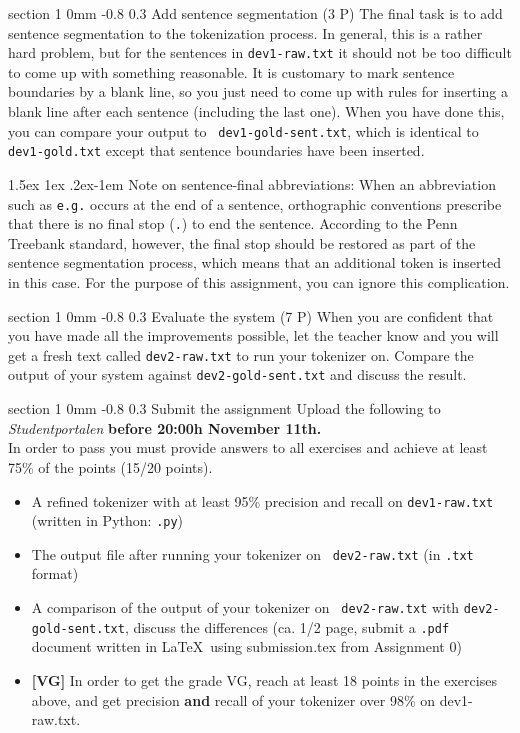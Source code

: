\documentclass[11pt]{article}
\makeatletter
\newcommand{\newsec}[2]{\section{#1}\label{sec:#2}\noindent}
\renewcommand{\section}{\@startsection
{section}%
{1}%
{0mm}%
{-0.8\baselineskip}%
{0.3\baselineskip}%
{\bfseries\large}}%
\renewcommand{\paragraph}{%
  \@startsection{paragraph}{4}%
  {\z@}{1.5ex \@plus 1ex \@minus .2ex}{-1em}%
  {\normalfont\normalsize\bfseries}%
}\makeatother
\makeatother
\begin{document}
\newsec{Add sentence segmentation (3 P)}{sent}%
The final task is to add sentence segmentation to the tokenization
process. In general, this is a rather hard problem, but for the
sentences in {\tt dev1-raw.txt} it should not be too difficult to come
up with something reasonable. It is customary to mark sentence
boundaries by a blank line, so you just need to come up with rules for
inserting a blank line after each sentence (including the last
one). When you have done this, you can compare your output to {\tt
  dev1-gold-sent.txt}, which is identical to {\tt dev1-gold.txt}
except that sentence boundaries have been inserted.

\paragraph{Note on sentence-final abbreviations:} When an abbreviation
such as {\tt e.g.} occurs at the end of a sentence, orthographic
conventions prescribe that there is no final stop ({\tt .}) to end the
sentence. According to the Penn Treebank standard, however, the final
stop should be restored as part of the sentence segmentation process,
which means that an additional token is inserted in this case. For the
purpose of this assignment, you can ignore this complication.

\newsec{Evaluate the system (7 P)}{eval}%
When you are confident that you have made all the improvements
possible, let the teacher know and you will get a fresh text called
{\tt dev2-raw.txt} to run your tokenizer on.  Compare the output of
your system against {\tt dev2-gold-sent.txt} and discuss the result.

\newsec{Submit the assignment}{submit}%
Upload the following to {\it Studentportalen} {\bf before 20:00h
  November 11th.}\\In order to pass you must provide answers to all
exercises and achieve at least 75\% of the points (15/20 points).
\begin{itemize}[noitemsep,topsep=0.2cm]
\item A refined tokenizer with at least 95\% precision and recall on {\tt dev1-raw.txt} (written in Python: \texttt{.py})
\item The output file after running your tokenizer on {\tt
    dev2-raw.txt} (in \texttt{.txt} format)
\item A comparison of the output of your tokenizer on {\tt
    dev2-raw.txt} with {\tt dev2-gold-sent.txt}, discuss the
  differences (ca. 1/2 page, submit a \texttt{.pdf} document written
  in \LaTeX\ using submission.tex from Assignment 0)
\item \textbf{[VG]} In order to get the grade VG, reach at least 18
  points in the exercises above, and get precision \textbf{and} recall
  of your tokenizer over 98\% on dev1-raw.txt.
\end{itemize}
\end{document}
